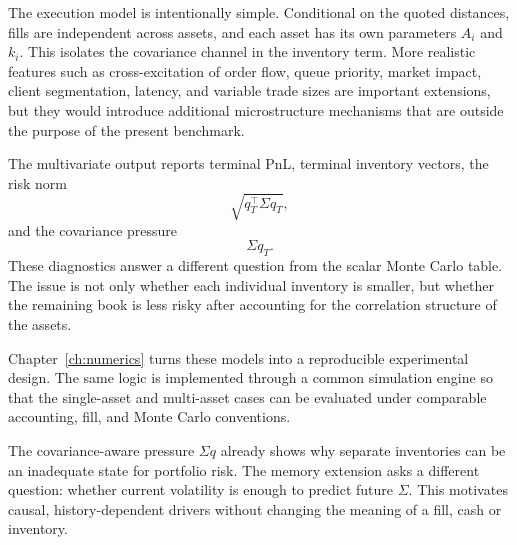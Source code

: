 The execution model is intentionally simple. Conditional on the quoted distances, fills are independent across assets, and each asset has its own parameters $A_i$ and $k_i$. This isolates the covariance channel in the inventory term. More realistic features such as cross-excitation of order flow, queue priority, market impact, client segmentation, latency, and variable trade sizes are important extensions, but they would introduce additional microstructure mechanisms that are outside the purpose of the present benchmark.

The multivariate output reports terminal PnL, terminal inventory vectors, the risk norm
\[
\sqrt{q_T^\top\Sigma q_T},
\]
and the covariance pressure
\[
\Sigma q_T.
\]
These diagnostics answer a different question from the scalar Monte Carlo table. The issue is not only whether each individual inventory is smaller, but whether the remaining book is less risky after accounting for the correlation structure of the assets.

Chapter~\ref{ch:numerics} turns these models into a reproducible experimental design. The same logic is implemented through a common simulation engine so that the single-asset and multi-asset cases can be evaluated under comparable accounting, fill, and Monte Carlo conventions.

The covariance-aware pressure $\Sigma q$ already shows why separate inventories can be an inadequate state for portfolio risk. The memory extension asks a different question: whether current volatility is enough to predict future $\Sigma$. This motivates causal, history-dependent drivers without changing the meaning of a fill, cash or inventory.
